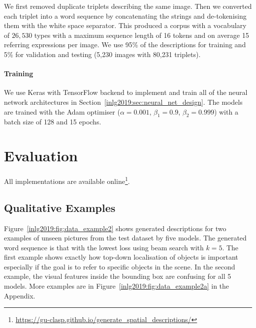We first removed duplicate %
triplets describing the same image. Then we converted each triplet into a word sequence by concatenating the strings and de-tokenising them with the white space separator.
This produced a corpus with a vocabulary of $26,530$ types with a maximum sequence length of 16 tokens and on average 15 referring expressions per image.
We use 95\% of the descriptions for training and 5\% for validation and testing
(5,230 images with 80,231 triplets).%


\paragraph{Training}\label{inlg2019:sec:implementation}
We use Keras \cite{chollet2015keras} with TensorFlow backend \cite{tensorflow2015-whitepaper} to implement and train all of the neural network architectures in Section~\ref{inlg2019:sec:neural_net_design}.
The models are trained with the Adam optimiser \cite{kingma2014adam} ($\alpha=0.001$, $\beta_1=0.9$, $\beta_2=0.999$) with a batch size of 128 and 15 epochs.

\section{Evaluation}\label{inlg2019:sec:evaluation}
All implementations are available online\footnote{
\url{https://gu-clasp.github.io/generate_spatial_descriptions/}}.
\subsection{Qualitative Examples}
Figure~\ref{inlg2019:fig:data_example2} shows generated descriptions for two
examples of unseen pictures from the test dataset by five models. The
generated word sequence is that with the lowest loss using beam search
with $k=5$. The first example shows exactly how top-down localisation of
objects is important especially if the goal is to refer to specific objects
in the scene. In the second example, the visual features inside the bounding
box are confusing for all 5 models. More examples are in Figure~\ref{inlg2019:fig:data_example2a} in the Appendix.


